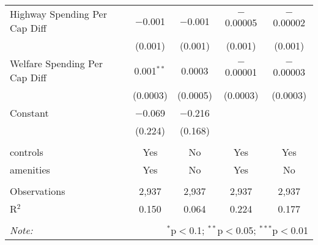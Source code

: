 \begin{table}[!htbp]
\begin{tabular}{@{\extracolsep{5pt}}lcccc}
  Highway Spending Per Cap Diff & $-$0.001 & $-$0.001 & $-$0.00005 & $-$0.00002 \\ 
  & (0.001) & (0.001) & (0.001) & (0.001) \\ 
  Welfare Spending Per Cap Diff & 0.001$^{**}$ & 0.0003 & $-$0.00001 & $-$0.00003 \\ 
  & (0.0003) & (0.0005) & (0.0003) & (0.0003) \\ 
  Constant & $-$0.069 & $-$0.216 &  &  \\ 
  & (0.224) & (0.168) &  &  \\ 
 \hline \\[-1.8ex] 
controls & Yes & No & Yes & Yes \\ 
amenities & Yes & No & Yes & No \\ 
\hline \\[-1.8ex] 
Observations & 2,937 & 2,937 & 2,937 & 2,937 \\ 
R$^{2}$ & 0.150 & 0.064 & 0.224 & 0.177 \\ 
\hline 
\hline \\[-1.8ex] 
\textit{Note:}  & \multicolumn{4}{r}{$^{*}$p$<$0.1; $^{**}$p$<$0.05; $^{***}$p$<$0.01} \\ 
\end{tabular} 
\end{table} 
